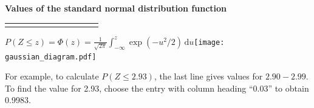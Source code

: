 \documentclass[a4paper]{article}
\begin{document}
\rule{0mm}{14mm}
\begin{center}
  {\Large\bf Values of the standard normal distribution function}
\end{center}

\rule{0mm}{5mm}
\pagestyle{empty}
\thispagestyle{empty}
\begin{table}[ht]
\centering
\begin{tabular}{rllllllllll}
  \hline \rule{0mm}{4mm}

   \hline
\end{tabular}
\end{table}

\noindent
\(\displaystyle P(Z\leqslant z)=\Phi(z)=\frac{1}{\sqrt{2\pi}}\int_{-\infty}^z\exp\left(-u^2/2\right)\,\mathrm{d}u\)\hfill\hbox{\texttt{[image: gaussian\_diagram.pdf]}}

\noindent For example, to calculate \(P(Z\leqslant 2.93)\), the last
line gives values for \(2.90-2.99\).  To find the value for 2.93,
choose the entry with column heading ``0.03'' to obtain 0.9983.

\end{document}
